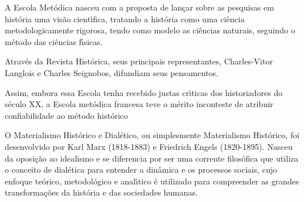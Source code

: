 \documentclass[
12pt,		%
openright,	%
twoside,  %
a4paper,			%
chapter=TITLE,		%
english,			%
french,				%
spanish,			%
brazil				%
]{USPSC-classe/USPSC}
\begin{document}
A Escola Met\'odica nasceu com a proposta de  lan\c{c}ar sobre as pesquisas em hist\'oria uma vis\~ao cient\'{\i}fica, tratando a hist\'oria como uma ci\^encia metodologicamente rigorosa, tendo como modelo as ci\^encias naturais, seguindo o m\'etodo das ci\^encias f\'{\i}sicas.

















Atrav\'es da Revista Hist\'orica, seus principais representantes, Charles-Vitor Langlois e Charles Seignobos, difundiam seus pensamentos.


















\noindent\begin{center}\mbox{\centering{}}\end{center}


Assim, embora essa Escola tenha recebido justas cr\'{\i}ticas dos historiadores do s\'eculo XX, a Escola met\'odica francesa teve o m\'erito inconteste de atribuir confiabilidade ao m\'etodo hist\'orico

















O Materialismo Hist\'orico e Dial\'etico, ou simplesmente Materialismo Hist\'orico, foi desenvolvido  por Karl Marx (1818-1883) e Friedrich Engels (1820-1895). Nasceu da oposi\c{c}\~ao ao idealismo e se diferencia por ser uma corrente filos\'ofica que utiliza o conceito de dial\'etica para entender a din\^amica e os processos sociais, cujo enfoque te\'orico, metodol\'ogico e anal\'{\i}tico \'e utilizado para compreender as grandes transforma\c{c}\~oes da hist\'oria e das sociedades humanas.
\end{document}
